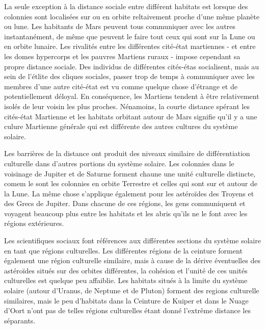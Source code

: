 La seule exception à la distance sociale entre différent habitats est lorsque des colonnies sont localisées sur ou en orbite reltaivement proche d'une même planète ou lune. Les habitants de Mars peuvent tous communiquer avec les autres instantanément, de même que peuvent le faire tout ceux qui sont sur la Lune ou en orbite lunaire. Les rivalités entre les différentes cité-état martiennes - et entre les domes hypercorps et les pauvres Martiens ruraux - impose cependant sa propre distance sociale. Des individus de différentes cités-étas socialisent, mais au sein de l'étlite des cliques sociales, passer trop de temps à communiquer avec les membres d'une autre cité-état est vu comme quelque chose d'étrange et de potentiellement déloyal. En conséquence, les Martiens tendent à être relativement isolés de leur voisin les plus proches. Nénamoins, la courte distance spérant les cités-état Martienne et les habitats orbitant autour de Mars signifie qu'il y a une culure Martienne générale qui est différente des autres cultures du système solaire. 

Les barrières de la distance ont produit des niveaux similaire de différentiation culturelle dans d'autres portions du système solaire. Les colonnies dans le voisinage de Jupiter et de Saturne forment chaune une unité culturelle distincte, comem le sont les colonnies en orbite Terrestre et celles qui sont sur et autour de la Lune. La même chose s'applique également pour les astéroïdes des Troyens et des Grecs de Jupiter. Dans chacune de ces régions, les gens communiquent et voyagent beaucoup plus entre les habitats et les abris qu'ils ne le font avec les régions extérieures. 

Les scientifiques sociaux font références aux différentes sections du système solaire en tant que régions culturelles. Les différentes régions de la ceinture forment également une région culturelle similaire, mais à cause de la dérive éventuelles des astéroïdes situés sur des orbites différentes, la cohésion et l'unité de ces unités culturelles est quelque peu affaiblie. Les habitats situés à la limite du système solaire (autour d'Uranus, de Neptune et de Pluton) forment des regions culturelle similaires, mais le peu d'habitats dans la Ceinture de Kuiper et dans le Nuage d'Oort n'ont pas de telles régions culturelles étant donné l'extrême distance les séparants. 

